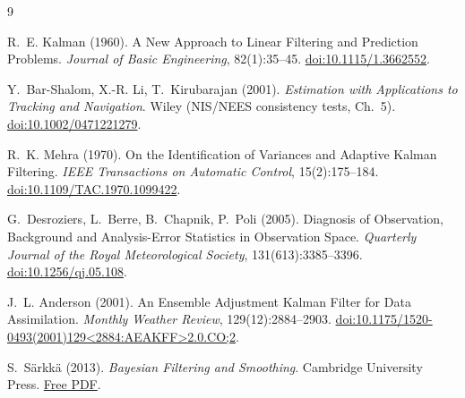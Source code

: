 \documentclass{article}
\begin{document}
\begin{thebibliography}{9}

R.~E. Kalman (1960).
\newblock A New Approach to Linear Filtering and Prediction Problems.
\newblock \emph{Journal of Basic Engineering}, 82(1):35--45.
\newblock \href{https://doi.org/10.1115/1.3662552}{doi:10.1115/1.3662552}.

Y.~Bar-Shalom, X.-R. Li, T.~Kirubarajan (2001).
\newblock \emph{Estimation with Applications to Tracking and Navigation}.
\newblock Wiley (NIS/NEES consistency tests, Ch.~5).
\newblock \href{https://doi.org/10.1002/0471221279}{doi:10.1002/0471221279}.

R.~K. Mehra (1970).
\newblock On the Identification of Variances and Adaptive Kalman Filtering.
\newblock \emph{IEEE Transactions on Automatic Control}, 15(2):175--184.
\newblock \href{https://doi.org/10.1109/TAC.1970.1099422}{doi:10.1109/TAC.1970.1099422}.

G.~Desroziers, L.~Berre, B.~Chapnik, P.~Poli (2005).
\newblock Diagnosis of Observation, Background and Analysis-Error Statistics in Observation Space.
\newblock \emph{Quarterly Journal of the Royal Meteorological Society}, 131(613):3385--3396.
\newblock \href{https://doi.org/10.1256/qj.05.108}{doi:10.1256/qj.05.108}.

J.~L. Anderson (2001).
\newblock An Ensemble Adjustment Kalman Filter for Data Assimilation.
\newblock \emph{Monthly Weather Review}, 129(12):2884--2903.
\newblock \href{https://doi.org/10.1175/1520-0493(2001)129<2884:AEAKFF>2.0.CO;2}{doi:10.1175/1520-0493(2001)129\textless2884:AEAKFF\textgreater2.0.CO;2}.

S.~S\"arkk\"a (2013).
\newblock \emph{Bayesian Filtering and Smoothing}.
\newblock Cambridge University Press.
\newblock \href{https://users.aalto.fi/~ssarkka/pub/cup_book_online_20131111.pdf}{Free PDF}.

\end{thebibliography}
\end{document}
